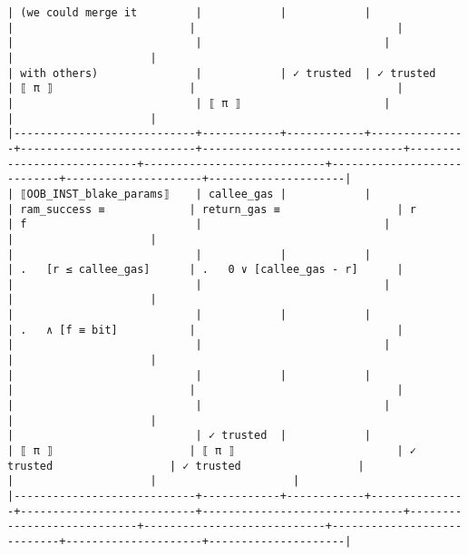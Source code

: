 \documentclass[varwidth=\maxdimen,margin=0.5cm,multi={verbatim}]{standalone}
\begin{document}
\begin{verbatim}
| (we could merge it         |            |            |               |                           |                               |                            |                            |                            |                     |                     |
| with others)               |            | ✓ trusted  | ✓ trusted     | ⟦ π ⟧                     |                               |                            |                            | ⟦ π ⟧                      |                     |                     |
|----------------------------+------------+------------+---------------+---------------------------+-------------------------------+----------------------------+----------------------------+----------------------------+---------------------+---------------------|
| ⟦OOB_INST_blake_params⟧    | callee_gas |            |               | ram_success ≡             | return_gas ≡                  | r                          | f                          |                            |                     |                     |
|                            |            |            |               | .   [r ≤ callee_gas]      | .   0 ∨ [callee_gas - r]      |                            |                            |                            |                     |                     |
|                            |            |            |               | .   ∧ [f ≡ bit]           |                               |                            |                            |                            |                     |                     |
|                            |            |            |               |                           |                               |                            |                            |                            |                     |                     |
|                            | ✓ trusted  |            |               | ⟦ π ⟧                     | ⟦ π ⟧                         | ✓ trusted                  | ✓ trusted                  |                            |                     |                     |
|----------------------------+------------+------------+---------------+---------------------------+-------------------------------+----------------------------+----------------------------+----------------------------+---------------------+---------------------|


\end{verbatim}
\end{document}
